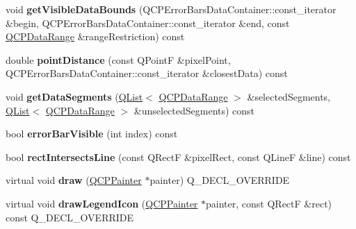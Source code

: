 \begin{DoxyCompactItemize}
\item 
void {\bfseries get\+Visible\+Data\+Bounds} (Q\+C\+P\+Error\+Bars\+Data\+Container\+::const\+\_\+iterator \&begin, Q\+C\+P\+Error\+Bars\+Data\+Container\+::const\+\_\+iterator \&end, const \hyperlink{class_q_c_p_data_range}{Q\+C\+P\+Data\+Range} \&range\+Restriction) const \hypertarget{class_q_c_p_error_bars_a4d86d520222be51851106312dff75c49}{}\label{class_q_c_p_error_bars_a4d86d520222be51851106312dff75c49}

\item 
double {\bfseries point\+Distance} (const Q\+PointF \&pixel\+Point, Q\+C\+P\+Error\+Bars\+Data\+Container\+::const\+\_\+iterator \&closest\+Data) const \hypertarget{class_q_c_p_error_bars_a6701c510c6a0ad95d3335c6f2470eca0}{}\label{class_q_c_p_error_bars_a6701c510c6a0ad95d3335c6f2470eca0}

\item 
void {\bfseries get\+Data\+Segments} (\hyperlink{class_q_list}{Q\+List}$<$ \hyperlink{class_q_c_p_data_range}{Q\+C\+P\+Data\+Range} $>$ \&selected\+Segments, \hyperlink{class_q_list}{Q\+List}$<$ \hyperlink{class_q_c_p_data_range}{Q\+C\+P\+Data\+Range} $>$ \&unselected\+Segments) const \hypertarget{class_q_c_p_error_bars_a1e9fef8dd1853558c05d1235c1a1b033}{}\label{class_q_c_p_error_bars_a1e9fef8dd1853558c05d1235c1a1b033}

\item 
bool {\bfseries error\+Bar\+Visible} (int index) const \hypertarget{class_q_c_p_error_bars_ae654c5016cebd994b104684578358afe}{}\label{class_q_c_p_error_bars_ae654c5016cebd994b104684578358afe}

\item 
bool {\bfseries rect\+Intersects\+Line} (const Q\+RectF \&pixel\+Rect, const Q\+LineF \&line) const \hypertarget{class_q_c_p_error_bars_a4c2f5cf2afe52b702c07c977758b29dd}{}\label{class_q_c_p_error_bars_a4c2f5cf2afe52b702c07c977758b29dd}

\item 
virtual void {\bfseries draw} (\hyperlink{class_q_c_p_painter}{Q\+C\+P\+Painter} $\ast$painter) Q\+\_\+\+D\+E\+C\+L\+\_\+\+O\+V\+E\+R\+R\+I\+DE\hypertarget{class_q_c_p_error_bars_aa3fe7904b723ea98acd4ab21ddf9404b}{}\label{class_q_c_p_error_bars_aa3fe7904b723ea98acd4ab21ddf9404b}

\item 
virtual void {\bfseries draw\+Legend\+Icon} (\hyperlink{class_q_c_p_painter}{Q\+C\+P\+Painter} $\ast$painter, const Q\+RectF \&rect) const Q\+\_\+\+D\+E\+C\+L\+\_\+\+O\+V\+E\+R\+R\+I\+DE\hypertarget{class_q_c_p_error_bars_af41ddd11b89881042a2ab19392d8a609}{}\label{class_q_c_p_error_bars_af41ddd11b89881042a2ab19392d8a609}


\end{DoxyCompactItemize}
